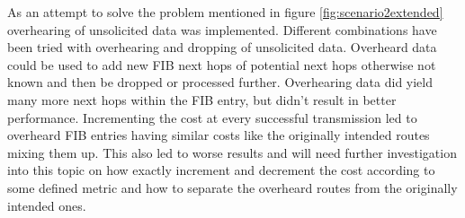 As an attempt to solve the problem mentioned in figure \ref{fig:scenario2extended} overhearing of unsolicited data was implemented. Different combinations have been tried with overhearing and dropping of unsolicited data. Overheard data could be used to add new FIB next hops of potential next hops otherwise not known and then be dropped or processed further. Overhearing data did yield many more next hops within the FIB entry, but didn't result in better performance. Incrementing the cost at every successful transmission led to overheard FIB entries having similar costs like the originally intended routes mixing them up. This also led to worse results and will need further investigation into this topic on how exactly increment and decrement the cost according to some defined metric and how to separate the overheard routes from the originally intended ones.


